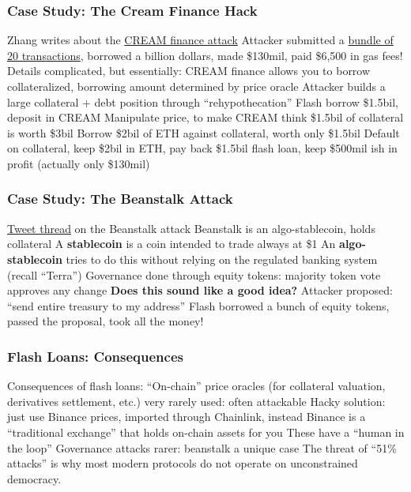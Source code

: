 \documentclass[]{beamer}
\begin{document}
\begin{frame}
\frametitle{Case Study: The Cream Finance Hack}

\bi
\m Zhang writes about the \href{https://medium.com/@anthonyleezhang/how-cream-finance-lost-130-million-in-one-trade-1853c83c20b3}{CREAM finance attack}
\m Attacker submitted a \href{https://etherscan.io/tx/0x0fe2542079644e107cbf13690eb9c2c65963ccb79089ff96bfaf8dced2331c92}{bundle of 20 transactions}, borrowed a billion dollars, made \$130mil, paid \$6,500 in gas fees!
\m Details complicated, but essentially:
\bi
\m CREAM finance allows you to borrow collateralized, borrowing amount determined by price oracle
\m Attacker builds a large collateral + debt position through ``rehypothecation''
\m Flash borrow \$1.5bil, deposit in CREAM
\m Manipulate price, to make CREAM think \$1.5bil of collateral is worth \$3bil
\m Borrow \$2bil of ETH against collateral, worth only \$1.5bil
\m Default on collateral, keep \$2bil in ETH, pay back \$1.5bil flash loan, keep \$500mil ish in profit (actually only \$130mil)
\ei
\ei

\end{frame}

\begin{frame}
\frametitle{Case Study: The Beanstalk Attack}

\bi
\m \href{https://twitter.com/AnthonyLeeZhang/status/1515702276396130307}{Tweet thread} on the Beanstalk attack 
\m Beanstalk is an algo-stablecoin, holds collateral 
\bi 
\m A \textbf{stablecoin} is a coin intended to trade always at \$1
\m An \textbf{algo-stablecoin} tries to do this without relying on the regulated banking system (recall ``Terra'') 
\ei 
\m Governance done through equity tokens: majority token vote approves any change \pause 
\m \textbf{Does this sound like a good idea?} \pause 
\m Attacker proposed: ``send entire treasury to my address'' \pause 
\m Flash borrowed a bunch of equity tokens, passed the proposal, took all the money!
\ei

\end{frame}

\begin{frame}
\frametitle{Flash Loans: Consequences}

Consequences of flash loans:
\bi
\m ``On-chain'' price oracles (for collateral valuation, derivatives settlement, etc.) very rarely used: often attackable
\m Hacky solution: just use Binance prices, imported through Chainlink, instead
\bi 
\m Binance is a ``traditional exchange'' that holds on-chain assets for you 
\m These have a ``human in the loop'' 
\ei 
\m Governance attacks rarer: beanstalk a unique case
\m The threat of ``51\% attacks'' is why most modern protocols do not operate on unconstrained democracy. 
\ei

\end{frame}
\end{document}

